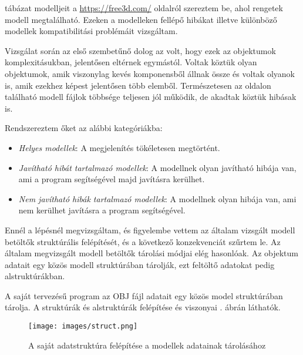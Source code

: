  tábázat modelljeit a \url{https://free3d.com/} oldalról szereztem be, ahol rengetek modell megtalálható. Ezeken a modelleken fellépő hibákat illetve különböző modellek kompatibilitási problémáit vizsgáltam.

Vizsgálat során az első szembetűnő dolog az volt, hogy ezek az objektumok komplexitásukban, jelentősen eltérnek egymástól. Voltak köztük olyan objektumok, amik viszonylag kevés komponensből állnak össze és voltak olyanok is, amik ezekhez képest jelentősen több elemből.
Természetesen az oldalon található modell fájlok többsége teljesen jól működik, de akadtak köztük hibásak is.

Rendszereztem őket az alábbi kategóriákba:
\begin{itemize}
\item \textit{Helyes modellek}:
A megjelenítés tökéletesen megtörtént.
\item \textit{Javítható hibát tartalmazó modellek}:
A modellnek olyan javítható hibája van, ami a program segítségével majd javításra kerülhet.
\item \textit{Nem javítható hibák tartalmazó modellek}:
A modellnek olyan hibája van, ami nem kerülhet javításra a program segítségével.
\end{itemize}
\bigskip


Ennél a lépésnél megvizsgáltam, és figyelembe vettem az általam vizsgált modell betöltők struktúrális felépítését, és a következő konzekvenciát szűrtem le.
Az általam megvizsgált modell betöltők tárolási módjai elég hasonlóak. Az objektum adatait egy közös modell struktúrában tárolják, ezt feltöltő adatokat pedig alstruktúrákban.

A saját tervezésű program az OBJ fájl adatait egy közös model struktúrában tárolja. A struktúrák és alstruktúrák felépítése és viszonyai . ábrán láthatók.

\begin{figure}[h]
\centering
\texttt{[image: images/struct.png]}
\caption{A saját adatstruktúra felépítése a modellek adatainak tárolásához}
\label{fig:struct}
\end{figure}

